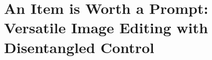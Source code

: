 \chapter{An Item is Worth a Prompt: Versatile Image Editing with Disentangled Control}
\label{chapter:dedit}


